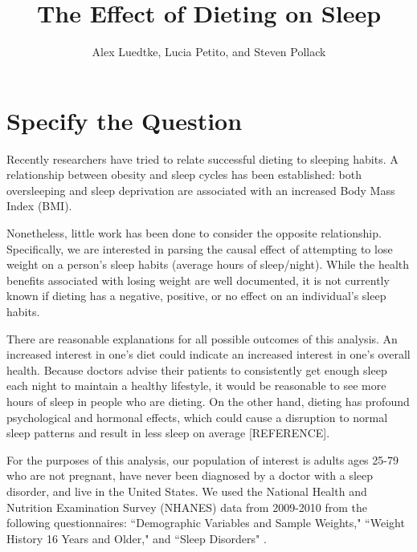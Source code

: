 \documentclass{article}
\begin{document}
%

\newcommand{\E}{\mathbb{E}}
\newcommand{\indp}{\ensuremath{\perp\hspace{-5pt}\perp}}
\newcommand{\M}{\mathcal{M}}
\newcommand{\given}{\; \mid \;}



\title{\textbf{The Effect of Dieting on Sleep}}
\author{Alex Luedtke, Lucia Petito, and Steven Pollack}
\date{}
\maketitle

\section{Specify the Question}

Recently researchers have tried to relate successful dieting to sleeping habits.  A relationship between obesity and sleep cycles has been established: both oversleeping and sleep deprivation \cite{sloss} are associated with an increased Body Mass Index (BMI). 

Nonetheless, little work has been done to consider the opposite relationship. Specifically, we are interested in parsing the causal effect of attempting to lose weight on a person's sleep habits (average hours of sleep/night). While the health benefits associated with losing weight are well documented, it is not currently known if dieting has a negative, positive, or no effect on an individual's sleep habits.

There are reasonable explanations for all possible outcomes of this analysis.  An increased interest in one's diet could indicate an increased interest in one's overall health.  Because doctors advise their patients to consistently get enough sleep each night to maintain a healthy lifestyle, it would be reasonable to see more hours of sleep in people who are dieting.  On the other hand, dieting has profound psychological and hormonal effects, which could cause a disruption to normal sleep patterns and result in less sleep on average [REFERENCE].

For the purposes of this analysis, our population of interest is adults ages 25-79 who are not pregnant, have never been diagnosed by a doctor with a sleep disorder, and live in the United States.  We used the National Health and Nutrition Examination Survey (NHANES) data from 2009-2010 \cite{data} from the following questionnaires: ``Demographic Variables and Sample Weights," ``Weight History 16 Years and Older," and ``Sleep Disorders" \cite{questionnaire}.
\end{document}

